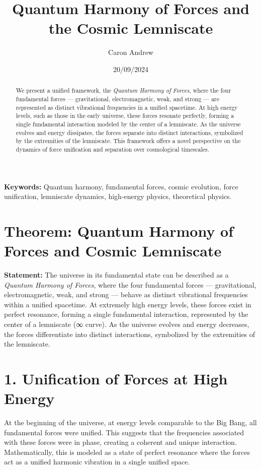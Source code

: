 \documentclass{article}
\title{Quantum Harmony of Forces and the Cosmic Lemniscate}
\author{Caron Andrew}
\date{20/09/2024}
\begin{document}
\maketitle

\begin{abstract}
We present a unified framework, the \textit{Quantum Harmony of Forces}, where the four fundamental forces — gravitational, electromagnetic, weak, and strong — are represented as distinct vibrational frequencies in a unified spacetime. At high energy levels, such as those in the early universe, these forces resonate perfectly, forming a single fundamental interaction modeled by the center of a lemniscate. As the universe evolves and energy dissipates, the forces separate into distinct interactions, symbolized by the extremities of the lemniscate. This framework offers a novel perspective on the dynamics of force unification and separation over cosmological timescales.
\end{abstract}

\textbf{Keywords:} Quantum harmony, fundamental forces, cosmic evolution, force unification, lemniscate dynamics, high-energy physics, theoretical physics.

\section{Theorem: Quantum Harmony of Forces and Cosmic Lemniscate}

\textbf{Statement:} The universe in its fundamental state can be described as a \textit{Quantum Harmony of Forces}, where the four fundamental forces — gravitational, electromagnetic, weak, and strong — behave as distinct vibrational frequencies within a unified spacetime. At extremely high energy levels, these forces exist in perfect resonance, forming a single fundamental interaction, represented by the center of a lemniscate (∞ curve). As the universe evolves and energy decreases, the forces differentiate into distinct interactions, symbolized by the extremities of the lemniscate.

\section{1. Unification of Forces at High Energy}

At the beginning of the universe, at energy levels comparable to the Big Bang, all fundamental forces were unified. This suggests that the frequencies associated with these forces were in phase, creating a coherent and unique interaction. Mathematically, this is modeled as a state of perfect resonance where the forces act as a unified harmonic vibration in a single unified space.
\end{document}
